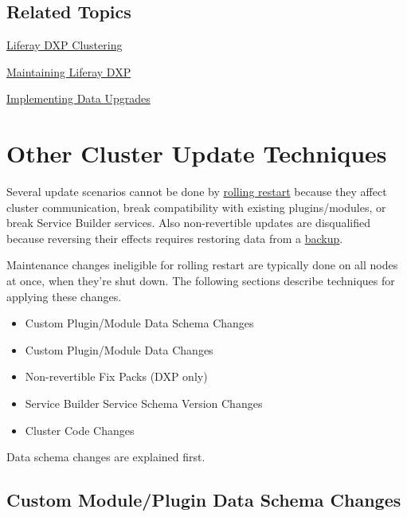 \subsection{Related Topics}\label{related-topics-1}

\href{/docs/7-0/deploy/-/knowledge_base/d/liferay-clustering}{Liferay
DXP Clustering}

\href{/docs/7-0/deploy/-/knowledge_base/d/maintaining-liferay}{Maintaining
Liferay DXP}

\href{/docs/7-0/tutorials/-/knowledge_base/t/data-upgrades-and-verifiers}{Implementing
Data Upgrades}

\section{Other Cluster Update
Techniques}\label{other-cluster-update-techniques}

Several update scenarios cannot be done by
\href{/docs/7-0/deploy/-/knowledge_base/d/using-rolling-restarts}{rolling
restart} because they affect cluster communication, break compatibility
with existing plugins/modules, or break Service Builder services. Also
non-revertible updates are disqualified because reversing their effects
requires restoring data from a
\href{/docs/7-0/deploy/-/knowledge_base/d/backing-up-a-liferay-installation}{backup}.

Maintenance changes ineligible for rolling restart are typically done on
all nodes at once, when they're shut down. The following sections
describe techniques for applying these changes.

\begin{itemize}
\tightlist
\item
  Custom Plugin/Module Data Schema Changes
\item
  Custom Plugin/Module Data Changes
\item
  Non-revertible Fix Packs (DXP only)
\item
  Service Builder Service Schema Version Changes
\item
  Cluster Code Changes
\end{itemize}

Data schema changes are explained first.

\subsection{Custom Module/Plugin Data Schema
Changes}\label{custom-moduleplugin-data-schema-changes}

